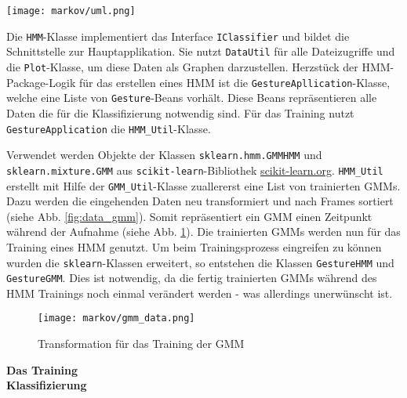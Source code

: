\begin{figure*}[htbp] \centering
    \texttt{[image: markov/uml.png]}
    \caption{Klassendiagram und Abhängigkeiten des \acl{HMM} Klassifikators}
    \label{fig:uml}
\end{figure*}


Die \texttt{HMM}-Klasse implementiert das Interface \texttt{IClassifier} und bildet die Schnittstelle zur Hauptapplikation. Sie nutzt \texttt{DataUtil}
 für alle Dateizugriffe und die \texttt{Plot}-Klasse, um diese Daten als Graphen darzustellen. Herzstück der HMM-Package-Logik für das erstellen eines
  \acl{HMM} ist die \texttt{GestureApllication}-Klasse, welche eine Liste von \texttt{Gesture}-Beans vorhält. Diese Beans repräsentieren alle Daten die für 
 die Klassifizierung notwendig sind. Für das Training nutzt \texttt{GestureApplication} die \texttt{HMM\_Util}-Klasse.

Verwendet werden Objekte der Klassen \texttt{sklearn.hmm.GMMHMM} und \texttt{sklearn.mixture.GMM} aus \texttt{scikit-learn}-Bibliothek \url{scikit-learn.org}.
\texttt{HMM\_Util} erstellt mit Hilfe der \texttt{GMM\_Util}-Klasse zuallererst eine List von trainierten \acl{GMM}s. Dazu werden die eingehenden Daten 
neu transformiert und nach Frames sortiert (siehe Abb. \ref{fig:data_gmm}). Somit repräsentiert ein \acl{GMM} einen Zeitpunkt während der Aufnahme 
(siehe Abb. \ref{fig:gmm_data}). Die trainierten \acl{GMM}s werden nun für das Training eines \acl{HMM} genutzt. Um beim Trainingsprozess eingreifen zu können
wurden die \texttt{sklearn}-Klassen erweitert, so entstehen die Klassen \texttt{GestureHMM} und \texttt{GestureGMM}. Dies ist notwendig, da die fertig trainierten
\acl{GMM}s während des \acl{HMM} Trainings noch einmal verändert werden - was allerdings unerwünscht ist. 

\begin{figure}[htbp] \centering
    \texttt{[image: markov/gmm\_data.png]}
    \caption{Transformation für das Training der \acl{GMM}}
    \label{fig:gmm_data}
\end{figure}

\textbf{Das Training} \\


\textbf{Klassifizierung} \\

